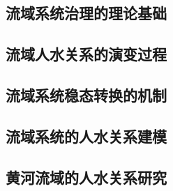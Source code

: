 \subsection{流域系统治理的理论基础}\label{ch1:sec:theories}


\subsection{流域人水关系的演变过程}\label{ch1:sec:process}


\subsection{流域系统稳态转换的机制}\label{ch1:sec:mechanism}


\subsection{流域系统的人水关系建模}\label{ch1:sec:model}


\subsection{黄河流域的人水关系研究}\label{ch1:sec:yellow_river}

